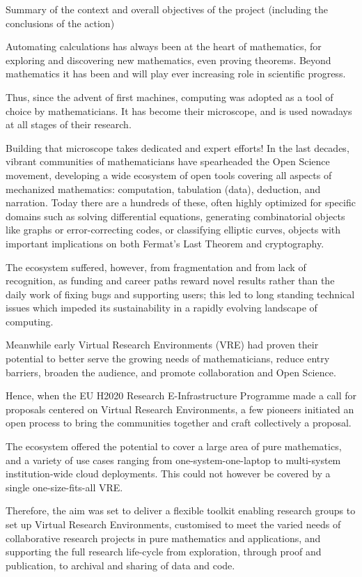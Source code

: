 Summary of the context and overall objectives of the project (including the conclusions of the action)

Automating calculations has always been at the heart of mathematics, for exploring and discovering new mathematics,
 even proving theorems. Beyond mathematics it has been and will play ever increasing role in scientific progress.

Thus, since the advent of first machines, computing was adopted as a tool of choice by mathematicians. It has
 become their microscope, and is used nowadays at all stages of their research.

Building that microscope takes dedicated and expert efforts! In the last decades, vibrant communities of 
mathematicians have spearheaded the Open Science movement, developing a wide ecosystem of open tools covering
all aspects of mechanized mathematics: computation, tabulation (data), deduction, and narration. Today there
are a hundreds of these, often highly optimized for specific domains such as solving differential equations, 
generating combinatorial objects like graphs or error-correcting codes, or classifying elliptic curves, objects 
with important implications on both Fermat’s Last Theorem and cryptography.

The ecosystem suffered, however, from fragmentation and from lack of recognition, as funding and career paths 
reward novel results rather than the daily work of fixing bugs and supporting users; this led to long standing 
technical issues which impeded its sustainability in a rapidly evolving landscape of computing.

Meanwhile early Virtual Research Environments (VRE) had proven their potential to better serve the growing needs
 of mathematicians, reduce entry barriers, broaden the audience, and promote collaboration and Open Science.

Hence, when the EU H2020 Research E-Infrastructure Programme made a call for proposals centered on Virtual 
Research Environments, a few pioneers initiated an open process to bring the communities together and craft 
collectively a proposal.

The ecosystem offered the potential to cover a large area of pure mathematics, and a variety of use cases 
ranging from one-system-one-laptop to multi-system institution-wide cloud deployments. This could not however 
be covered by a single one-size-fits-all VRE.

Therefore, the aim was set to deliver a flexible toolkit enabling research groups to set up Virtual Research 
Environments, customised to meet the varied needs of collaborative research projects in pure mathematics and 
applications, and supporting the full research life-cycle from exploration, through proof and publication, to 
archival and sharing of data and code.

